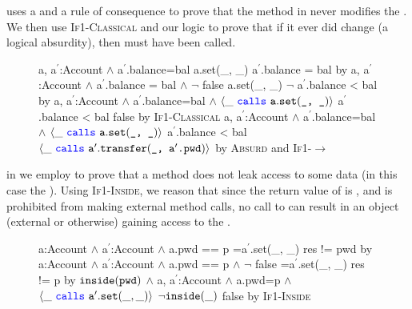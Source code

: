 \textbf{} uses a 
 \funcSpec and a rule of consequence
to prove that the  method in 
never modifies the . We then use \textsc{If1-Classical}
and our \Nec logic to prove that if it ever did change (a logical absurdity),
then  must have been called.
\begin{figure}[htb]
{
	\begin{proofexample}
			{\proofstepwithrule
				{\hoareEx
						{a, a$^\prime$:Account $\wedge$ a$^\prime$.balance=bal}
						{a.set(\_, \_)}
						{a$^\prime$.balance = bal}
						}
					{by \funcSpec}
			}
			{\proofstepwithrule
				{\hoareEx
						{a, a$^\prime$:Account $\wedge$ a$^\prime$.balance = bal $\wedge$ $\neg$ false}
						{a.set(\_, \_)}
						{$\neg$ a$^\prime$.balance < bal }
						}
					{by 
					} %
			}
			{\proofstepwithrule
				{\onlyIfSingleExAlt
						{a, a$^\prime$:Account $\wedge$ a$^\prime$.balance=bal $\wedge$ $\langle \_\ {\color{blue}\texttt{calls}}\ {\texttt{a}}.{\texttt{set}}({\texttt{\_, \_}}) \rangle$}
						{a$^\prime$.balance < bal}
						{false}
						}
					{by \textsc{If1-Classical}}
			}
			{\proofstepwithrule
				{\onlyIfSingleExAlt
						{a, a$^\prime$:Account $\wedge$ a$^\prime$.balance=bal $\wedge$ $\langle \_\ {\color{blue}\texttt{calls}}\ {\texttt{a}}.{\texttt{set}}({\texttt{\_, \_}}) \rangle$}
						{a$^\prime$.balance < bal}
						{$\langle \_\ {\color{blue}\texttt{calls}}\ {\texttt{a}}^\prime.{\texttt{transfer}}({\texttt{\_, a$^\prime$.pwd}}) \rangle$}
						}
					{by \textsc{Absurd} and \textsc{If1-}$\longrightarrow$}
			}
		\endproofsteps
	\end{proofexample}
}
\end{figure}

 in \textbf{}  we employ \funcSpecs %
to prove that a method does not leak access to some data (in this case the ).
Using \textsc{If1-Inside}, we reason that since the return value of  is
, and  is prohibited from making external method calls,
no call to  can result in an object (external or otherwise) gaining access to the .
\begin{figure}[htb]
{
	\begin{proofexample}
		\proofsteps{SetPwdLeak}
			{\proofstepwithrule
				{\hoareEx
						{a:Account $\wedge$ a$^\prime$:Account $\wedge$ a.pwd == p}
						{=a$^\prime$.set(\_, \_)}
						{res != pwd}
						}
					{by \funcSpec}
			}
			{\proofstepwithrule
				{\hoareEx
						{a:Account $\wedge$ a$^\prime$:Account $\wedge$ a.pwd == p $\wedge$ $\neg$ false}
						{=a$^\prime$.set(\_, \_)}
						{res != p}
						}
					{by } %
			}
			{\proofstepwithrule
				{\onlyIfSingleExAlt
						{$\texttt{inside}( {\texttt{pwd}} )$ $\wedge$ a, a$^\prime$:Account $\wedge$ a.pwd=p $\wedge$ $\langle \_\ {\color{blue}\texttt{calls}}\ {\texttt{a}}^\prime.{\texttt{set}}(\_, \_) \rangle$}
						{$\neg \texttt{inside}( \_ )$}
						{false}
						}
					{by \textsc{If1-Inside}}
			}
		\endproofsteps
	\end{proofexample}
	}
	\end{figure}
	
